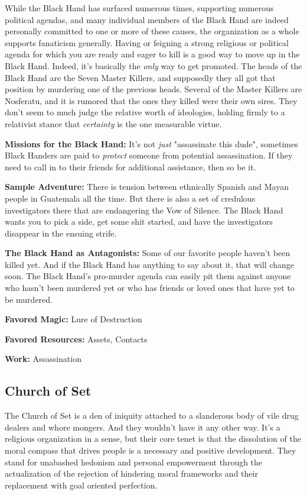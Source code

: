 While the Black Hand has surfaced numerous times, supporting numerous political agendas, and many individual members of the Black Hand are indeed personally committed to one or more of these causes, the organization as a whole supports fanaticism generally. Having or feigning a strong religious or political agenda for which you are ready and eager to kill is a good way to move up in the Black Hand. Indeed, it's basically the \textit{only} way to get promoted. The heads of the Black Hand are the Seven Master Killers, and supposedly they all got that position by murdering one of the previous heads. Several of the Master Killers are Nosferatu, and it is rumored that the ones they killed were their own sires. They don't seem to much judge the relative worth of ideologies, holding firmly to a relativist stance that \textit{certainty} is the one measurable virtue. 

\textbf{Missions for the Black Hand:} It's not \textit{just} "assassinate this dude", sometimes Black Handers are paid to \textit{protect} someone from potential assassination. If they need to call in to their friends for additional assistance, then so be it.

\textbf{Sample Adventure:} There is tension between ethnically Spanish and Mayan people in Guatemala all the time. But there is also a set of credulous investigators there that are endangering the Vow of Silence. The Black Hand wants you to pick a side, get some shit started, and have the investigators disappear in the ensuing strife.

\textbf{The Black Hand as Antagonists:} Some of our favorite people haven't been killed yet. And if the Black Hand has anything to say about it, that will change soon. The Black Hand's pro-murder agenda can easily pit them against anyone who hasn't been murdered yet or who has friends or loved ones that have yet to be murdered.

\textbf{Favored Magic:} Lure of Destruction

\textbf{Favored Resources:} Assets, Contacts

\textbf{Work:} Assassination

\subsection{Church of Set} 

The Church of Set is a den of iniquity attached to a slanderous body of vile drug dealers and whore mongers. And they wouldn't have it any other way. It's a religious organization in a sense, but their core tenet is that the dissolution of the moral compass that drives people is a necessary and positive development. They stand for unabashed hedonism and personal empowerment through the actualization of the rejection of hindering moral frameworks and their replacement with goal oriented perfection.


